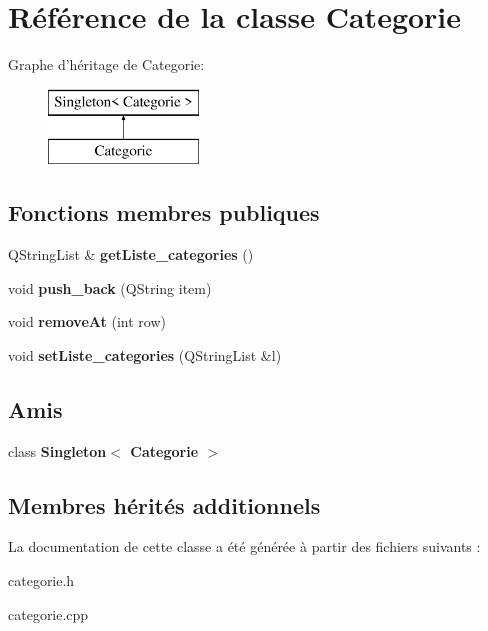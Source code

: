 \hypertarget{class_categorie}{\section{Référence de la classe Categorie}
\label{class_categorie}
}
Graphe d'héritage de Categorie\+:\begin{figure}[H]
\begin{center}
\leavevmode
\includegraphics[height=2.000000cm]{class_categorie}
\end{center}
\end{figure}
\subsection*{Fonctions membres publiques}
\begin{DoxyCompactItemize}
\item 
\hypertarget{class_categorie_a1a5b66b96088fd925281e98292850999}{Q\+String\+List \& {\bfseries get\+Liste\+\_\+categories} ()}\label{class_categorie_a1a5b66b96088fd925281e98292850999}

\item 
\hypertarget{class_categorie_aedf4676357581efafda630ae1920f153}{void {\bfseries push\+\_\+back} (Q\+String item)}\label{class_categorie_aedf4676357581efafda630ae1920f153}

\item 
\hypertarget{class_categorie_a2c38ad4e3d79107b16105fb2546f30a8}{void {\bfseries remove\+At} (int row)}\label{class_categorie_a2c38ad4e3d79107b16105fb2546f30a8}

\item 
\hypertarget{class_categorie_ad7c93d27fa0291eab42e72bc7466a3bf}{void {\bfseries set\+Liste\+\_\+categories} (Q\+String\+List \&l)}\label{class_categorie_ad7c93d27fa0291eab42e72bc7466a3bf}

\end{DoxyCompactItemize}
\subsection*{Amis}
\begin{DoxyCompactItemize}
\item 
\hypertarget{class_categorie_a7f9e2dd5a60262d4a4a9dab397a68ed0}{class {\bfseries Singleton$<$ Categorie $>$}}\label{class_categorie_a7f9e2dd5a60262d4a4a9dab397a68ed0}

\end{DoxyCompactItemize}
\subsection*{Membres hérités additionnels}


La documentation de cette classe a été générée à partir des fichiers suivants \+:\begin{DoxyCompactItemize}
\item 
categorie.\+h\item 
categorie.\+cpp\end{DoxyCompactItemize}
